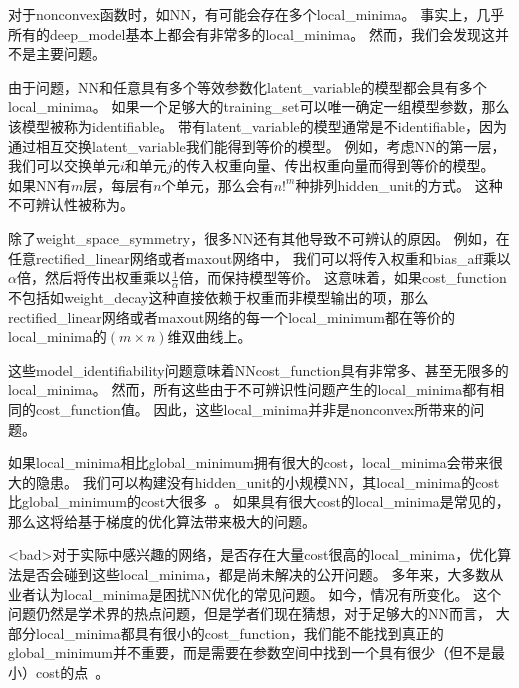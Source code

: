 对于\gls{nonconvex}函数时，如\gls{NN}，有可能会存在多个\gls{local_minima}。
事实上，几乎所有的\gls{deep_model}基本上都会有非常多的\gls{local_minima}。
然而，我们会发现这并不是主要问题。


由于问题，\gls{NN}和任意具有多个等效参数化\gls{latent_variable}的模型都会具有多个\gls{local_minima}。
如果一个足够大的\gls{training_set}可以唯一确定一组模型参数，那么该模型被称为\gls{identifiable}。
带有\gls{latent_variable}的模型通常是不\gls{identifiable}，因为通过相互交换\gls{latent_variable}我们能得到等价的模型。
例如，考虑\gls{NN}的第一层，我们可以交换单元$i$和单元$j$的传入权重向量、传出权重向量而得到等价的模型。
如果\gls{NN}有$m$层，每层有$n$个单元，那么会有$n!^m$种排列\gls{hidden_unit}的方式。
这种不可辨认性被称为。


除了\gls{weight_space_symmetry}，很多\gls{NN}还有其他导致不可辨认的原因。
例如，在任意\gls{rectified_linear}网络或者\gls{maxout}网络中，
我们可以将传入权重和\gls{bias_aff}乘以 $\alpha$倍，然后将传出权重乘以$\frac{1}{\alpha}$倍，而保持模型等价。
这意味着，如果\gls{cost_function}不包括如\gls{weight_decay}这种直接依赖于权重而非模型输出的项，那么\gls{rectified_linear}网络或者\gls{maxout}网络的每一个\gls{local_minimum}都在等价的\gls{local_minima}的$(m\times n)$维双曲线上。


这些\gls{model_identifiability}问题意味着\gls{NN}\gls{cost_function}具有非常多、甚至无限多的\gls{local_minima}。
然而，所有这些由于不可辨识性问题产生的\gls{local_minima}都有相同的\gls{cost_function}值。
因此，这些\gls{local_minima}并非是\gls{nonconvex}所带来的问题。


如果\gls{local_minima}相比\gls{global_minimum}拥有很大的\gls{cost}，\gls{local_minima}会带来很大的隐患。
我们可以构建没有\gls{hidden_unit}的小规模\gls{NN}，其\gls{local_minima}的\gls{cost}比\gls{global_minimum}的\gls{cost}大很多~\citep{Sontag-cs89,Brady89,Gori-pami91}。
如果具有很大\gls{cost}的\gls{local_minima}是常见的，那么这将给基于梯度的优化算法带来极大的问题。


<bad>对于实际中感兴趣的网络，是否存在大量\gls{cost}很高的\gls{local_minima}，优化算法是否会碰到这些\gls{local_minima}，都是尚未解决的公开问题。
多年来，大多数从业者认为\gls{local_minima}是困扰\gls{NN}优化的常见问题。
如今，情况有所变化。
这个问题仍然是学术界的热点问题，但是学者们现在猜想，对于足够大的\gls{NN}而言，
大部分\gls{local_minima}都具有很小的\gls{cost_function}，我们能不能找到真正的\gls{global_minimum}并不重要，而是需要在参数空间中找到一个具有很少（但不是最小）\gls{cost}的点~\citep{Saxe-et-al-ICLR13,Dauphin-et-al-NIPS2014-small,GoodfellowOptimization15,Choromanska-et-al-AISTATS2015}。

